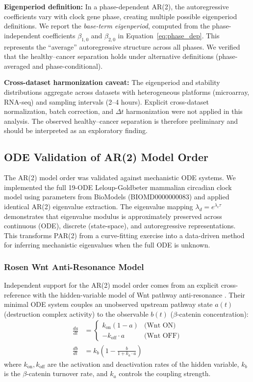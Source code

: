 \documentclass[11pt,a4paper]{article}
\begin{document}
\textbf{Eigenperiod definition:} In a phase-dependent AR(2), the autoregressive coefficients vary with clock gene phase, creating multiple possible eigenperiod definitions. We report the \textit{base-term eigenperiod}, computed from the phase-independent coefficients $\beta_{1,0}$ and $\beta_{2,0}$ in Equation~\ref{eq:phase_dep}. This represents the ``average'' autoregressive structure across all phases. We verified that the healthy--cancer separation holds under alternative definitions (phase-averaged and phase-conditional).

\textbf{Cross-dataset harmonization caveat:} The eigenperiod and stability distributions aggregate across datasets with heterogeneous platforms (microarray, RNA-seq) and sampling intervals (2--4 hours). Explicit cross-dataset normalization, batch correction, and $\Delta t$ harmonization were not applied in this analysis. The observed healthy--cancer separation is therefore preliminary and should be interpreted as an exploratory finding.

\subsection{ODE Validation of AR(2) Model Order}

The AR(2) model order was validated against mechanistic ODE systems. We implemented the full 19-ODE Leloup-Goldbeter mammalian circadian clock model \citep{leloup2003} using parameters from BioModels (BIOMD0000000083) and applied identical AR(2) eigenvalue extraction. The eigenvalue mapping $\lambda_d = e^{\lambda_c \tau}$ demonstrates that eigenvalue modulus is approximately preserved across continuous (ODE), discrete (state-space), and autoregressive representations. This transforms PAR(2) from a curve-fitting exercise into a data-driven method for inferring mechanistic eigenvalues when the full ODE is unknown.

\subsubsection*{Rosen Wnt Anti-Resonance Model}

Independent support for the AR(2) model order comes from an explicit cross-reference with the hidden-variable model of Wnt pathway anti-resonance \citep{rosen2026}. Their minimal ODE system couples an unobserved upstream pathway state $a(t)$ (destruction complex activity) to the observable $b(t)$ ($\beta$-catenin concentration):
\begin{align}
\frac{da}{dt} &= \begin{cases} k_{\text{on}}(1 - a) & \text{(Wnt ON)} \\ -k_{\text{off}} \cdot a & \text{(Wnt OFF)} \end{cases} \label{eq:rosen_a} \\
\frac{db}{dt} &= k_b\left(1 - \frac{b}{1 + k_a \cdot a}\right) \label{eq:rosen_b}
\end{align}
where $k_{\text{on}}, k_{\text{off}}$ are the activation and deactivation rates of the hidden variable, $k_b$ is the $\beta$-catenin turnover rate, and $k_a$ controls the coupling strength.
\end{document}
